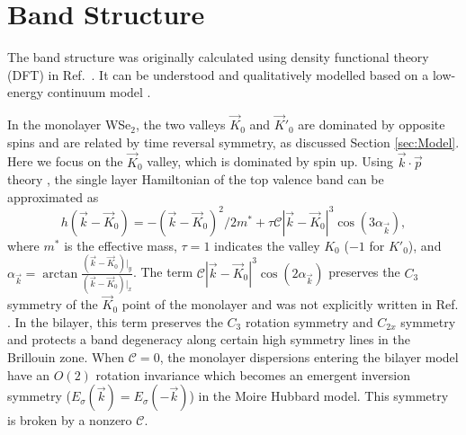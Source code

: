 \documentclass[%
reprint,
superscriptaddress,
twocolumn,
 amsmath,amssymb,
 aps,
 prb,
]{revtex4-2}
\begin{document}
\appendix
\section{Band Structure}\label{app:band_structure}
The band structure was originally calculated using density functional theory (DFT) in Ref.~\cite{Wang:2020us}. It can be understood and qualitatively modelled based on a low-energy continuum model \cite{wu2019topological}.

In the monolayer WSe$_2$, the two valleys $\vec K_0$ and $\vec K'_0$ are dominated by opposite spins and are related by time reversal symmetry, as discussed Section \ref{sec:Model}. Here we focus on the $\vec K_0$ valley, which is dominated by spin up. Using $\vec{k}\cdot \vec{p}$ theory \cite{Korm_nyos_2015}, the single layer Hamiltonian of the top valence band can be approximated as
\begin{equation}
    h({\vec{k}-\vec{K}_0})=-(\vec{k}-\vec{K}_0)^{2} / 2 m^\ast + \tau\mathcal{C}|\vec{k}-\vec{K}_0|^{3} \cos (3 \alpha_{\vec{k}}),
    \label{eq:Hmonolayer}
\end{equation}
where $m^\ast$ is the effective mass, $\tau=1$ indicates the valley $K_0$ ($-1$ for $K'_0$), and $\alpha_{\vec{k}}=\arctan\frac{(\vec{k}-\vec{K}_0)|_y}{(\vec{k}-\vec{K}_0)|_x}$. The term $\mathcal{C}|\vec{k}-\vec{K}_0|^{3} \cos (2 \alpha_{\vec{k}})$ preserves the $C_3$ symmetry of the $\vec{K}_0$ point of the monolayer and was not explicitly written in Ref. \cite{wu2019topological}. In the bilayer, this term preserves the $C_3$ rotation symmetry and $C_{2x}$ symmetry and protects a band degeneracy along certain high symmetry lines in the Brillouin zone. When $\mathcal{C} = 0$, the monolayer dispersions entering the bilayer model have an $O(2)$ rotation invariance which becomes an emergent inversion symmetry ($E_\sigma(\vec{k})=E_\sigma(-\vec{k})$) in the Moire Hubbard model. This symmetry is broken by a nonzero $\mathcal{C}$.
\end{document}
